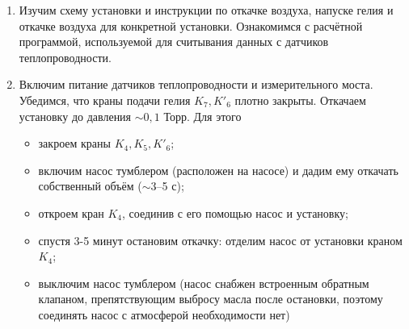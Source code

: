 \documentclass{article}
\begin{document}
\begin{enumerate}
\item Изучим схему установки и инструкции по откачке воздуха, напуске гелия и откачке воздуха для конкретной установки. Ознакомимся с расчётной программой, используемой для считывания данных с датчиков теплопроводности. 
\item Включим питание датчиков теплопроводности и измерительного моста. Убедимся, что краны подачи гелия $K_7, K'_6$ плотно закрыты. Откачаем установку до давления $\sim 0,1$ Торр. Для этого
\begin{itemize}
\item закроем краны $K_4, K_5, K'_6$;
\item включим насос тумблером (расположен на насосе) и дадим ему откачать собственный объём ($\sim $3–5 с);
\item откроем кран $K_4$, соединив с его помощью насос и установку;
\item спустя 3-5 минут остановим откачку: отделим насос от установки краном $K_4$;
\item выключим насос тумблером (насос снабжен встроенным обратным клапаном, препятствующим выбросу масла после остановки, поэтому соединять насос с атмосферой необходимости нет)
\end{itemize}


\end{enumerate}
\end{document}
